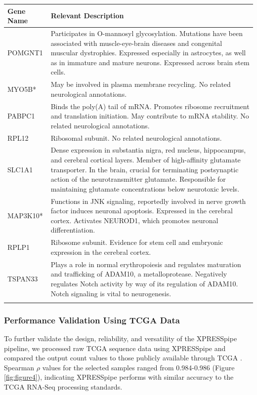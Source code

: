 \documentclass[10pt, oneside]{article}
\begin{document}
\begin{table}[!]
    \centering
{}
\begin{tabular}{p{2.5cm}p{15.5cm}}
 \textbf{Gene Name} & \textbf{Relevant Description} \\
 \hline
 POMGNT1 & Participates in O-mannosyl glycosylation. Mutations have been associated with muscle-eye-brain diseases and congenital muscular dystrophies. Expressed especially in astrocytes, as well as in immature and mature neurons. Expressed across brain stem cells. \\
 \hline
 MYO5B* & May be involved in plasma membrane recycling. No related neurological annotations. \\
 \hline
 PABPC1 & Binds the poly(A) tail of mRNA. Promotes ribosome recruitment and translation initiation. May contribute to mRNA stability. No related neurological annotations. \\
 \hline
 RPL12 & Ribosomal subunit. No related neurological annotations. \\
 \hline
 SLC1A1 & Dense expression in substantia nigra, red nucleus, hippocampus, and cerebral cortical layers. Member of high-affinity glutamate transporter. In the brain, crucial for terminating postsynaptic action of the neurotransmitter glutamate. Responsible for maintaining glutamate concentrations below neurotoxic levels. \\
 \hline
 MAP3K10* & Functions in JNK signaling, reportedly involved in nerve growth factor induces neuronal apoptosis. Expressed in the cerebral cortex. Activates NEUROD1, which promotes neuronal differentiation. \\
 \hline
 RPLP1 & Ribosome subunit. Evidence for stem cell and embryonic expression in the cerebral cortex. \\
 \hline
 TSPAN33 & Plays a role in normal erythropoiesis and regulates maturation and trafficking of ADAM10, a metalloprotease. Negatively regulates Notch activity by way of its regulation of ADAM10. Notch signaling is vital to neurogenesis. \\
 \label{tab:targets}
\end{tabular}
\end{table}


\subsubsection{Performance Validation Using TCGA Data}
To further validate the design, reliability, and versatility of the XPRESSpipe pipeline, we processed raw TCGA sequence data using XPRESSpipe and compared the output count values to those publicly available through TCGA \cite{tcga}. Spearman $\rho$ values for the selected samples ranged from 0.984-0.986 (Figure \ref{fig:figure4}), indicating XPRESSpipe performs with similar accuracy to the TCGA RNA-Seq processing standards. \par
\end{document}
